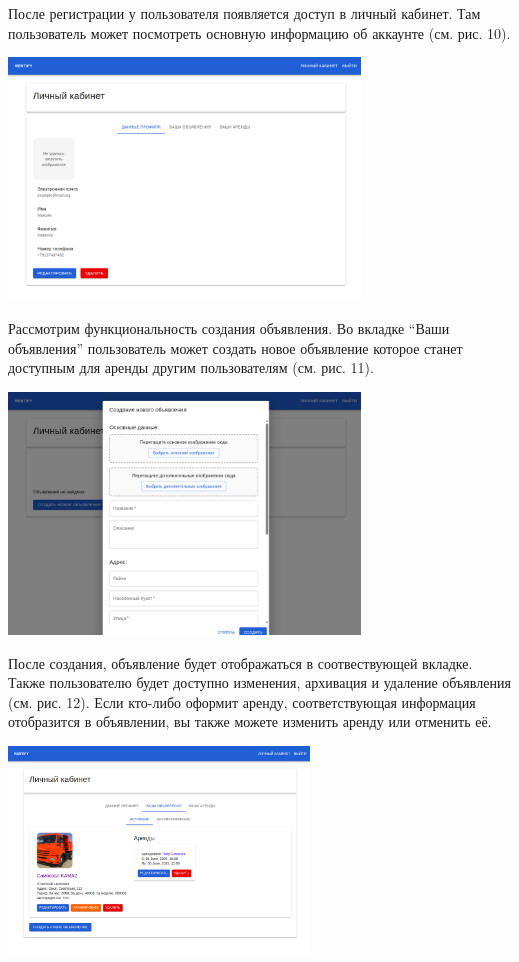 \documentclass[14pt]{extarticle}
\begin{document}
После регистрации у пользователя появляется доступ в личный кабинет.
Там пользователь может посмотреть основную информацию об аккаунте (см. рис. 10).

\begin{center}
    \includegraphics[width=0.7\textwidth]{account.png}
\end{center}

Рассмотрим функциональность создания объявления.
Во вкладке ``Ваши объявления'' пользователь может создать новое объявление
которое станет доступным для аренды другим пользователям (см. рис. 11).

\begin{center}
    \includegraphics[width=0.7\textwidth]{listings01.png}
\end{center}

После создания, объявление будет отображаться в соотвествующей вкладке.
Также пользователю будет доступно изменения, архивация и удаление объявления
(см. рис. 12). Если кто-либо оформит аренду, соответствующая информация отобразится в объявлении,
вы также можете изменить аренду или отменить её.

\begin{center}
    \includegraphics[width=0.6\textwidth]{listings02.png}
\end{center}
\end{document}
